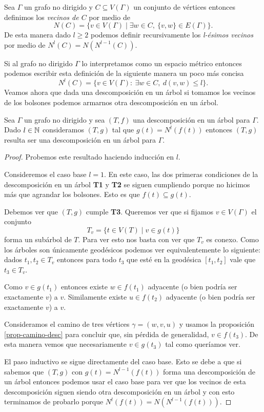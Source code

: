 \documentclass[tesis.tex]{subfiles}
\begin{document}
\begin{deff}
	Sea $\Gamma$ un grafo no dirigido y $C \subseteq V(\Gamma)$ un conjunto de vértices entonces definimos los \emph{vecinos de $C$} por medio de 
	\[
	N(C) = \{ v \in V(\Gamma) \mid \exists w \in C, \ \{v,w \} \in E(\Gamma) \}.
	\]
	De esta manera dado $l \ge 2$ podemos definir recursivamente los \emph{l-ésimos vecinos} por medio de $N^l(C) = N(N^{l-1}(C))$.
\end{deff}


	Si al grafo no dirigido $\Gamma$ lo interpretamos como un espacio métrico entonces podemos escribir esta definición de la siguiente manera un poco más concisa
	\[
		N^l (C) = \{ v \in V(\Gamma) : \ \exists w \in C, \  d(v,w) \le l  \}.
	\]
	Veamos ahora que dada una descomposición en un árbol si tomamos los vecinos de los bolsones podemos armarnos otra descomposición en un árbol.


\begin{prop}\label{prop-vecinos-desc}
	Sea $\Gamma$ un grafo no dirigido y sea $(T,f)$ una descomposición en un árbol para $\Gamma$.
	Dado $l \in \mathbb{N}$ consideramos $(T,g)$ tal que $g(t) = N^l(f(t))$ entonces $(T,g)$ resulta ser una descomposición en un árbol para $\Gamma$.
\end{prop}
\begin{proof}
	Probemos este resultado haciendo inducción en $l$.
	
	Consideremos el caso base $l=1$.
	En este caso, las dos primeras condiciones de la descomposición en un árbol \textbf{T1} y \textbf{T2} se siguen cumpliendo porque no hicimos más que agrandar los bolsones. 
	Esto es que $f(t) \subseteq g(t)$.
	
	Debemos ver que $(T,g)$ cumple \textbf{T3}.
	Queremos ver que si fijamos $v \in V(\Gamma)$ el conjunto 
	\[
		T_{v} = \{ t \in V(T) \mid v \in g(t)  \}
	\]
	forma un subárbol de $T$. 
	Para ver esto nos basta con ver que $T_{v}$ es conexo.
	Como los árboles son únicamente geodésicos podemos ver equivalentemente lo siguiente:
	dados $t_{1}, t_{2} \in T_{v}$ entonces para todo $t_{3}$ que esté en la geodésica $[t_{1}, t_{2}]$ vale que $t_{3} \in T_{v}$. 
	
	Como $v \in g(t_{1})$ entonces existe $w \in f(t_{1})$ adyacente (o bien podría ser exactamente $v$) a $v$.
	Similamente existe $u \in f(t_{2})$ adyacente (o bien podría ser exactamente $v$) a $v$.
	
	Consideramos el camino de tres vértices $\gamma = (w,v,u)$ y usamos la proposición \ref{prop-camino-desc} para concluir que, sin pérdida de generalidad, $v \in f(t_{3})$.
	De esta manera vemos que necesariamente $v \in g(t_{3})$ tal como queríamos ver.
		
	El paso inductivo se sigue directamente del caso base.
	Esto se debe a que si sabemos que $(T,g)$ con $g(t) = N^{l-1}(f(t))$ forma una descomposición de un árbol entonces podemos usar el caso base para ver que los vecinos de esta descomposición siguen siendo otra descomposición en un árbol y con esto terminamos de probarlo porque $N^l(f(t)) = N (N^{l-1}(f(t)))$.
\end{proof}
\medskip
\end{document}
